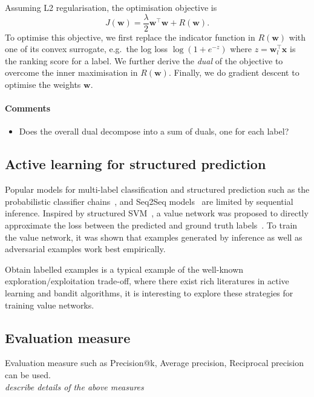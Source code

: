 \documentclass[9pt]{extarticle}
\newcommand{\llb}{\llbracket}
\newcommand{\rrb}{\rrbracket}
\newcommand{\x}{\mathbf{x}}
\newcommand{\y}{\mathbf{y}}
\newcommand{\1}{\mathbf{1}}
\newcommand{\w}{\mathbf{w}}
\newcommand{\pb}[1]{^{({#1})}}
\newcommand{\eg}{e.g.\ }
\begin{document}

Assuming L2 regularisation, the optimisation objective is
\begin{equation*}
J(\w) = \frac{\lambda}{2}\w^\top \w + R(\w).
\end{equation*}
To optimise this objective, we first replace the indicator function in $R(\w)$ with one of its convex surrogate, 
\eg the log loss $\log(1+e^{-z})$ where $z = \w_l^\top \x$ is the ranking score for a label.
We further derive the \emph{dual} of the objective to overcome the inner maximisation in $R(\w)$.
Finally, we do gradient descent to optimise the weights $\w$.

\paragraph{Comments}
{\it
\begin{itemize}
\item Does the overall dual decompose into a sum of duals, one for each label?
\end{itemize}
}



\subsection*{Active learning for structured prediction}

Popular models for multi-label classification and structured prediction such as the probabilistic classifier chains~\cite{dembczynski:2010},
and Seq2Seq models~\cite{Vinyals:2017} are limited by sequential inference. 
Inspired by structured SVM~\cite{taskar2004max,tsochantaridis2004support}, 
a value network was proposed to directly approximate the loss between the predicted and ground truth labels~\cite{gygli17a}.
To train the value network, it was shown that examples generated by inference as well as adversarial examples work best empirically. 

Obtain labelled examples is a typical example of the well-known exploration/exploitation trade-off, where there exist rich literatures in active learning and bandit algorithms, it is interesting to explore these strategies for training value networks.



\subsection{Evaluation measure}
Evaluation measure such as Precision@k, Average precision, Reciprocal precision can be used.
\\ \emph{describe details of the above measures}

%
%


\end{document}
